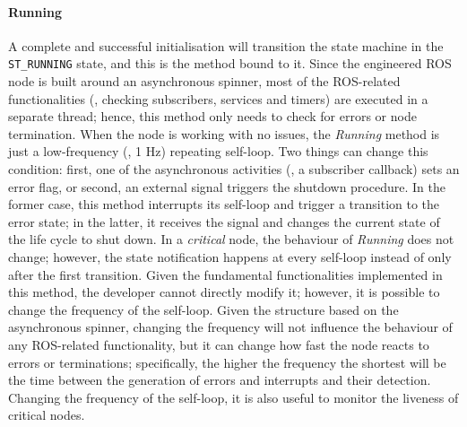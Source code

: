 \paragraph{Running} A complete and successful initialisation will transition the state machine in the \texttt{ST\_RUNNING} state, and this is the method bound to it. Since the engineered ROS node is built around an asynchronous spinner, most of the ROS-related functionalities (\ie, checking subscribers, services and timers) are executed in a separate thread; hence, this method only needs to check for errors or node termination. When the node is working with no issues, the \textit{Running} method is just a low-frequency (\ie, 1 Hz) repeating self-loop. Two things can change this condition: first, one of the asynchronous activities (\eg, a subscriber callback) sets an error flag, or second, an external signal triggers the shutdown procedure. In the former case, this method interrupts its self-loop and trigger a transition to the error state; in the latter, it receives the signal and changes the current state of the life cycle to shut down. In a \textit{critical} node, the behaviour of \textit{Running} does not change; however, the state notification happens at every self-loop instead of only after the first transition. Given the fundamental functionalities implemented in this method, the developer cannot directly modify it; however, it is possible to change the frequency of the self-loop. Given the structure based on the asynchronous spinner, changing the frequency will not influence the behaviour of any ROS-related functionality, but it can change how fast the node reacts to errors or terminations; specifically, the higher the frequency the shortest will be the time between the generation of errors and interrupts and their detection. Changing the frequency of the self-loop, it is also useful to monitor the liveness of critical nodes. 

